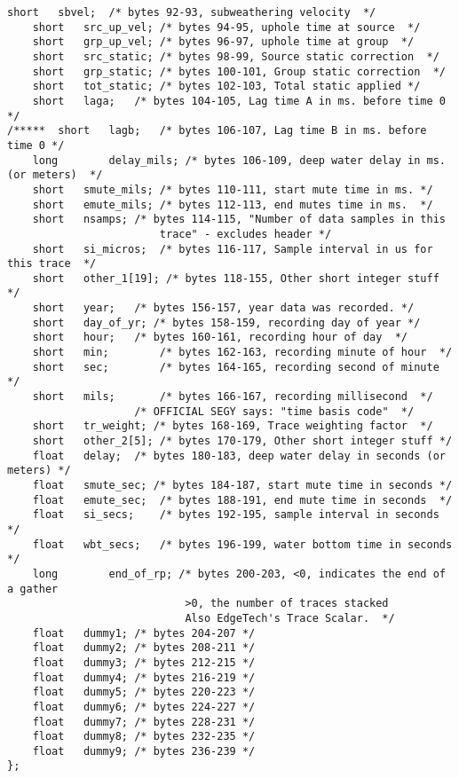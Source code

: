 \begin{lstlisting}[caption={segy\_header.h}]
	short	sbvel;	/* bytes 92-93, subweathering velocity  */
	short	src_up_vel; /* bytes 94-95, uphole time at source  */
	short	grp_up_vel; /* bytes 96-97, uphole time at group  */
	short	src_static; /* bytes 98-99, Source static correction  */
	short	grp_static; /* bytes 100-101, Group static correction  */
	short	tot_static; /* bytes 102-103, Total static applied */
	short	laga;	/* bytes 104-105, Lag time A in ms. before time 0 */
/*****	short	lagb;	/* bytes 106-107, Lag time B in ms. before time 0 */
	long		delay_mils; /* bytes 106-109, deep water delay in ms. (or meters)  */
	short	smute_mils; /* bytes 110-111, start mute time in ms. */
	short	emute_mils; /* bytes 112-113, end mutes time in ms.  */
	short	nsamps;	/* bytes 114-115, "Number of data samples in this
						trace" - excludes header */
	short	si_micros;	/* bytes 116-117, Sample interval in us for this trace  */
	short	other_1[19]; /* bytes 118-155, Other short integer stuff */
	short	year;	/* bytes 156-157, year data was recorded. */
	short	day_of_yr; /* bytes 158-159, recording day of year */
	short	hour;	/* bytes 160-161, recording hour of day  */
	short	min;		/* bytes 162-163, recording minute of hour  */
	short	sec;		/* bytes 164-165, recording second of minute */
	short	mils;		/* bytes 166-167, recording millisecond  */
					/* OFFICIAL SEGY says: "time basis code"  */
	short	tr_weight; /* bytes 168-169, Trace weighting factor  */
	short	other_2[5]; /* bytes 170-179, Other short integer stuff */
	float	delay;	/* bytes 180-183, deep water delay in seconds (or meters) */
	float	smute_sec; /* bytes 184-187, start mute time in seconds */
	float	emute_sec;	/* bytes 188-191, end mute time in seconds  */
	float	si_secs;	/* bytes 192-195, sample interval in seconds */
	float	wbt_secs;	/* bytes 196-199, water bottom time in seconds */
	long		end_of_rp; /* bytes 200-203, <0, indicates the end of a gather
							>0, the number of traces stacked
							Also EdgeTech's Trace Scalar.  */
	float	dummy1;	/* bytes 204-207 */
	float	dummy2;	/* bytes 208-211 */
	float	dummy3;	/* bytes 212-215 */
	float	dummy4;	/* bytes 216-219 */
	float	dummy5;	/* bytes 220-223 */
	float	dummy6;	/* bytes 224-227 */
	float	dummy7;	/* bytes 228-231 */
	float	dummy8;	/* bytes 232-235 */
	float	dummy9;	/* bytes 236-239 */
};
\end{lstlisting}
